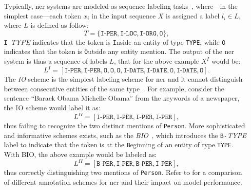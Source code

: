 Typically, \ac{ner} systems are modeled as sequence labeling tasks~\cite{jm3,keraghel2024recentadvancesnamedentity,entityorientedsearch2018balog}, where---in the simplest case---each token $x_i$ in the input sequence $X$ is assigned a label $l_i \in L$, where $L$ is defined as follow:
\begin{equation}
    T = \{\texttt{I-PER}, \texttt{I-LOC}, \texttt{I-ORG}, \texttt{O}\},
\end{equation}
\texttt{I-}\textit{TYPE} indicates that the token is \texttt{I}nside an entity of type \texttt{TYPE}, while \texttt{O} indicates that the token is \texttt{O}utside any entity mention. The output of the \ac{ner} system is thus a sequence of labels $L$, that for the above example $X^I$ would be:
\begin{equation}
L^I = [\texttt{I-PER}, \texttt{I-PER}, \texttt{O}, \texttt{O}, \texttt{O}, \texttt{I-DATE}, \texttt{I-DATE}, \texttt{O}, \texttt{I-DATE}, \texttt{O}].
\end{equation}
The \emph{IO} scheme is the simplest labeling scheme for \ac{ner} and it cannot distinguish between consecutive entities of the same type~\cite{alshammari2021impact}. For example, consider the sentence ``Barack Obama Michelle Obama'' from the keywords of a newspaper, the IO scheme would label it as:
\begin{equation}
L^{II} = [\texttt{I-PER}, \texttt{I-PER}, \texttt{I-PER}, \texttt{I-PER}],
\end{equation}
thus failing to recognize the two distinct mentions of \texttt{Person}. More sophisticated and informative schemes exists, such as the \emph{BIO}~\cite{ramshaw-marcus-1995-text-bio-scheme}, which introduces the \texttt{B-}\textit{TYPE} label to indicate that the token is at the \texttt{B}eginning of an entity of type \texttt{TYPE}. With BIO, the above example would be labeled as:
\begin{equation}
L^{II} = [\texttt{B-PER}, \texttt{I-PER}, \texttt{B-PER}, \texttt{I-PER}],
\end{equation}
thus correctly distinguishing two mentions of \texttt{Person}.
Refer to \textcite{alshammari2021impact} for a comparison of different annotation schemes for \ac{ner} and their impact on model performance.


